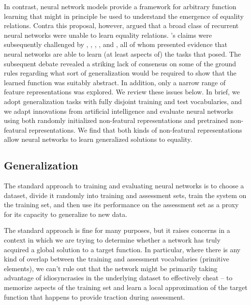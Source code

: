 \documentclass[9pt,twocolumn,twoside,lineno]{pnas-new}
\newcommand{\updatea}[1]{{\color{darkred}#1}}
\begin{document}
In contrast, neural network models provide a framework for arbitrary function learning that might in principle be used to understand the emergence of equality relations. Contra this proposal, however, \citet{marcus:1999} argued that a broad class of recurrent neural networks were unable to learn equality relations. \citeauthor{marcus:1999}'s claims were subsequently challenged by \citet{dienes:1999}, \citet{seidenberg:1999a}, \citet{seidenberg:1999b}, \citet{elman:1999}, and \citet{negishi:1999}, all of whom presented evidence that neural networks are able to learn (at least aspects of) the tasks that \citeauthor{marcus:1999} posed. \updatea{The subsequent debate \citep[reviewed in][]{alhama:2019} revealed a striking lack of consensus on some of the ground rules regarding what sort of generalization would be required to show that the learned function was suitably abstract. In addition, only a narrow range of feature representations was explored. We review these issues below. In brief, we adopt generalization tasks with fully disjoint training and test vocabularies, and we adapt innovations from artificial intelligence and evaluate neural networks using both randomly initialized non-featural representations and pretrained non-featural representations. We find that both kinds of non-featural representations allow neural networks to learn generalized solutions to equality.}


\subsection{Generalization}

The standard approach to training and evaluating neural networks is to choose a dataset, divide it randomly into training and assessment sets, train the system on the training set, and then use its performance on the assessment set as a proxy for its capacity to generalize to new data.

The standard approach is fine for many purposes, but it raises concerns in a context in which we are trying to determine whether a network has truly acquired a global solution to a target function. In particular, where there is any kind of overlap between the training and assessment vocabularies (primitive elements), we can't rule out that the network might be primarily taking advantage of idiosyncrasies in the underlying dataset to effectively cheat -- to memorize aspects of the training set and learn a local approximation of the target function that happens to provide traction during assessment.
\end{document}
